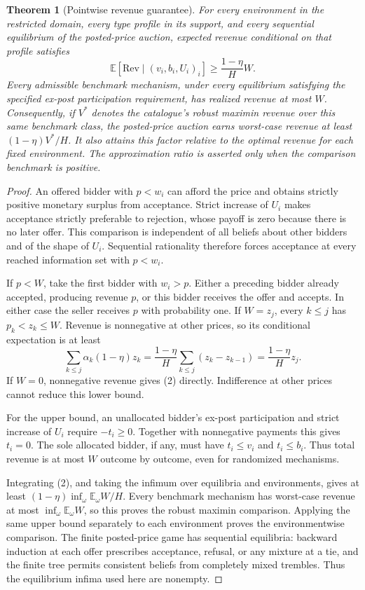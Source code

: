 \documentclass[11pt]{article}
\newtheorem{theorem}{Theorem}
\theoremstyle{remark}\newtheorem{remark}[theorem]{Remark}
\newcommand{\E}{\mathbb E}
\begin{document}
\begin{theorem}[Pointwise revenue guarantee]\label{thm:posted}
For every environment in the restricted domain, every type profile in its support, and every sequential equilibrium of the posted-price auction, expected revenue conditional on that profile satisfies
\[
 \E[\mathrm{Rev}\mid(v_i,b_i,U_i)_i]\geq\frac{1-\eta}{H}W.        \tag{2}
\]
Every admissible benchmark mechanism, under every equilibrium satisfying the specified ex-post participation requirement, has realized revenue at most $W$. Consequently, if $V^*$ denotes the catalogue's robust maximin revenue over this same benchmark class, the posted-price auction earns worst-case revenue at least $(1-\eta)V^*/H$. It also attains this factor relative to the optimal revenue for each fixed environment. The approximation ratio is asserted only when the comparison benchmark is positive.
\end{theorem}
\begin{proof}
An offered bidder with $p<w_i$ can afford the price and obtains strictly positive monetary surplus from acceptance. Strict increase of $U_i$ makes acceptance strictly preferable to rejection, whose payoff is zero because there is no later offer. This comparison is independent of all beliefs about other bidders and of the shape of $U_i$. Sequential rationality therefore forces acceptance at every reached information set with $p<w_i$.

If $p<W$, take the first bidder with $w_i>p$. Either a preceding bidder already accepted, producing revenue $p$, or this bidder receives the offer and accepts. In either case the seller receives $p$ with probability one. If $W=z_j$, every $k\leq j$ has $p_k<z_k\leq W$. Revenue is nonnegative at other prices, so its conditional expectation is at least
\[
 \sum_{k\leq j}\alpha_k(1-\eta)z_k
 =\frac{1-\eta}{H}\sum_{k\leq j}(z_k-z_{k-1})
 =\frac{1-\eta}{H}z_j.
\]
If $W=0$, nonnegative revenue gives (2) directly. Indifference at other prices cannot reduce this lower bound.

For the upper bound, an unallocated bidder's ex-post participation and strict increase of $U_i$ require $-t_i\geq0$. Together with nonnegative payments this gives $t_i=0$. The sole allocated bidder, if any, must have $t_i\leq v_i$ and $t_i\leq b_i$. Thus total revenue is at most $W$ outcome by outcome, even for randomized mechanisms.

Integrating (2), and taking the infimum over equilibria and environments, gives at least $(1-\eta)\inf_\omega\E_\omega W/H$. Every benchmark mechanism has worst-case revenue at most $\inf_\omega\E_\omega W$, so this proves the robust maximin comparison. Applying the same upper bound separately to each environment proves the environmentwise comparison. The finite posted-price game has sequential equilibria: backward induction at each offer prescribes acceptance, refusal, or any mixture at a tie, and the finite tree permits consistent beliefs from completely mixed trembles. Thus the equilibrium infima used here are nonempty.
\end{proof}
\end{document}
